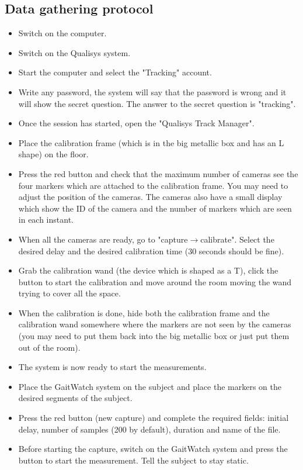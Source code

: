 \subsection{Data gathering protocol}
\begin{itemize}
\item Switch on the computer.
\item Switch on the Qualisys system.
\item Start the computer and select the "Tracking" account.
\item Write any password, the system will say that the password is wrong and it will show the secret question. The answer to the secret question is "tracking".
\item Once the session has started, open the "Qualisys Track Manager". 
\item Place the calibration frame (which is in the big metallic box and has an L shape) on the floor. 
\item Press the red button and check that the maximum number of cameras see the four markers which are attached to the calibration frame. You may need to adjust the position of the cameras. The cameras also have a small display which show the ID of the camera and the number of markers which are seen in each instant.
\item When all the cameras are ready, go to "capture$\rightarrow$calibrate". Select the desired delay and the desired calibration time (30 seconds should be fine). 
\item Grab the calibration wand (the device which is shaped as a T), click the button to start the calibration and move around the room moving the wand trying to cover all the space.
\item When the calibration is done, hide both the calibration frame and the calibration wand somewhere where the markers are not seen by the cameras (you may need to put them back into the big metallic box or just put them out of the room).
\item The system is now ready to start the measurements.
\item Place the GaitWatch system on the subject and place the markers on the desired segments of the subject. 
\item Press the red button (new capture) and complete the required fields: initial delay, number of samples (200 by default), duration and name of the file. 
\item Before starting the capture, switch on the GaitWatch system and press the button to start the measurement. Tell the subject to stay static.

\end{itemize}
